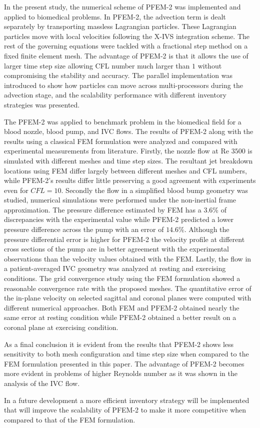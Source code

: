 In the present study, the numerical scheme of PFEM-2 was implemented and applied to biomedical problems. In PFEM-2, the advection term is dealt separately by transporting massless Lagrangian particles. These Lagrangian particles move with local velocities following the X-IVS integration scheme. The rest of the governing equations were tackled with a fractional step method on a fixed finite element mesh. The advantage of PFEM-2 is that it allows the use of larger time step size allowing CFL number much larger than $1$ without compromising the stability and accuracy. The parallel implementation was introduced to show how particles can move across multi-processors during the advection stage, and the scalability performance with different inventory strategies was presented. 

The PFEM-2 was applied to benchmark problem in the biomedical field for a blood nozzle, blood pump, and IVC flows. The results of PFEM-2 along with the results using a classical FEM formulation were analyzed and compared with experimental measurements from literature. Firstly, the nozzle flow at Re $3500$ is simulated with different meshes and time step sizes. The resultant jet breakdown locations using FEM differ largely between different meshes and CFL numbers, while PFEM-2's results differ little preserving a good agreement with experiments even for $CFL=10$. Secondly the flow in a simplified blood bump geometry was studied, numerical simulations were performed under the non-inertial frame approximation. The pressure difference estimated by FEM has a $3.6$\% of discrepancies with the experimental value while PFEM-2 predicted a lower pressure difference across the pump with an error of $14.6$\%. Although the pressure differential error is higher for PFEM-2 the velocity profile at different cross sections of the pump are in better agreement with the experimental observations than the velocity values obtained with the FEM. Lastly, the flow in a patient-averaged IVC geometry was analyzed at resting and exercising conditions. The grid convergence study using the FEM formulation showed a reasonable convergence rate with the proposed meshes. The quantitative error of the in-plane velocity on selected sagittal and coronal planes were computed with different numerical approaches. Both FEM and PFEM-2 obtained nearly the same error at resting condition while PFEM-2 obtained a better result on a coronal plane at exercising condition.

As a final conclusion it is evident from the results that PFEM-2 shows less sensitivity to both mesh configuration and time step size when compared to the FEM formulation presented in this paper. The advantage of PFEM-2 becomes more evident in problems of higher Reynolds number as it was shown in the analysis of the IVC flow.

In a future development a more efficient inventory strategy will be implemented that will improve the scalability of PFEM-2 to make it more competitive when compared to that of the FEM formulation.
